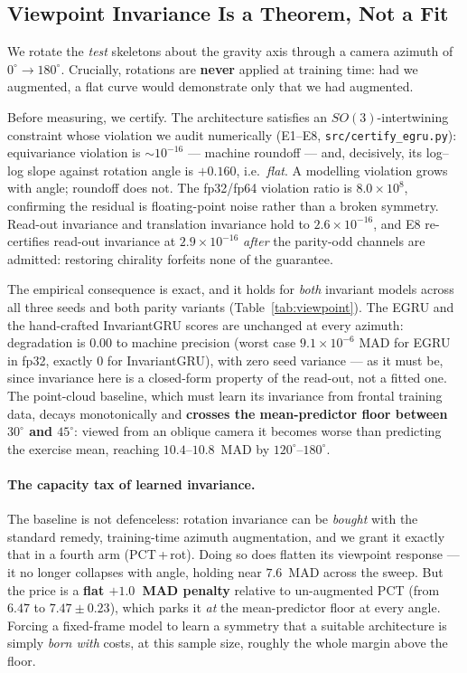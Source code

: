 \documentclass[10pt,journal]{IEEEtran}
\begin{document}
\subsection{Viewpoint Invariance Is a Theorem, Not a Fit}
\label{sec:results:viewpoint}

We rotate the \emph{test} skeletons about the gravity axis through a camera azimuth of
$0^\circ\!\to\!180^\circ$. Crucially, rotations are \textbf{never} applied at training time: had we
augmented, a flat curve would demonstrate only that we had augmented.

Before measuring, we certify. The architecture satisfies an $SO(3)$-intertwining constraint whose
violation we audit numerically (E1--E8, \texttt{src/certify\_egru.py}): equivariance violation is
$\sim\!10^{-16}$ --- machine roundoff --- and, decisively, its log--log slope against rotation angle
is $+0.160$, i.e.\ \emph{flat}. A modelling violation grows with angle; roundoff does not. The
fp32/fp64 violation ratio is $8.0\times10^{8}$, confirming the residual is floating-point noise
rather than a broken symmetry. Read-out invariance and translation invariance hold to
$2.6\times10^{-16}$, and E8 re-certifies read-out invariance at $2.9\times10^{-16}$ \emph{after} the
parity-odd channels are admitted: restoring chirality forfeits none of the guarantee.

The empirical consequence is exact, and it holds for \emph{both} invariant models across all three
seeds and both parity variants (Table~\ref{tab:viewpoint}). The EGRU and the hand-crafted
InvariantGRU scores are unchanged at every azimuth: degradation is $0.00$ to machine precision
(worst case $9.1\times10^{-6}$ MAD for EGRU in fp32, exactly $0$ for InvariantGRU), with zero seed
variance --- as it must be, since invariance here is a closed-form property of the read-out, not a
fitted one. The point-cloud baseline, which must learn its invariance from frontal training data,
decays monotonically and \textbf{crosses the mean-predictor floor between $30^\circ$ and $45^\circ$}:
viewed from an oblique camera it becomes worse than predicting the exercise mean, reaching
$10.4$--$10.8$~MAD by $120^\circ$--$180^\circ$.

\paragraph{The capacity tax of learned invariance.} The baseline is not defenceless: rotation
invariance can be \emph{bought} with the standard remedy, training-time azimuth augmentation, and we
grant it exactly that in a fourth arm (PCT\,+\,rot). Doing so does flatten its viewpoint response ---
it no longer collapses with angle, holding near $7.6$~MAD across the sweep. But the price is a
\textbf{flat $+1.0$~MAD penalty} relative to un-augmented PCT (from $6.47$ to $7.47\pm0.23$), which
parks it \emph{at} the mean-predictor floor at every angle. Forcing a fixed-frame model to learn a
symmetry that a suitable architecture is simply \emph{born with} costs, at this sample size, roughly
the whole margin above the floor.
\end{document}
